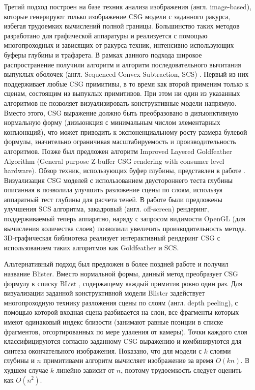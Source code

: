 {{{{{Третий подход построен на базе техник анализа изображения (англ. image-based), которые генерируют только изображение CSG модели с заданного ракурса, избегая трудоемких вычислений полной границы. Большинство таких методов разработано для графической аппаратуры и реализуется с помощью многопроходных и зависящих от ракурса техник, интенсивно использующих буферы глубины и трафарета. В рамках данного подхода широкое распространение получили алгоритм  и алгоритм последовательного вычитания выпуклых оболочек (англ. Sequenced Convex Subtraction, SCS) \todo{[3]}. Первый из них поддерживает любые CSG примитивы, в то время как второй применим только к сценам, состоящим из выпуклых примитивов. При этом ни один из указанных  алгоритмов не позволяет визуализировать конструктивные модели напрямую. Вместо этого, CSG выражение должно быть преобразовано в дизъюнктивную нормальную форму (дизъюнкция с минимальным числом элементарных конъюнкций), что может приводить к экспоненциальному росту размера булевой формулы, значительно ограничивая  масштабируемость и производительность алгоритмов. Позже был предложен алгоритм Improved Layered Goldfeather Algorithm (General purpose Z-buffer CSG rendering with consumer level hardware). Обзор техник, использующих буфер глубины, представлен в работе \todo{[93]}. Визуализация CSG моделей с использованием двустороннего теста глубины описанная в \todo{[42]} позволила улучшить разложение сцены по слоям, используя аппаратный тест глубины для расчета теней. В работе \todo{[52]} были предложены улучшения SCS алгоритма, закадровый (англ. off-screen) рендеринг, поддерживаемый теперь аппаратно, наряду с запросом видимости OpenGL (для вычисления количества слоев) позволили увеличить производительность метода. 3D-графическая библиотека  реализует интерактивный рендеринг CSG с использованием таких алгоритмов как Goldfeather и SCS. 

Альтернативный подход был предложен в более поздней работе \cmd{[4]} и получил название Blister. Вместо нормальной формы, данный метод преобразует CSG формулу к списку BList \todo{[5]}, содержащему каждый примитив ровно один раз. Для визуализации заданной конструктивной модели Blister задействует многопроходную технику разложения сцены по слоям (англ. depth peeling), с помощью которой входная сцена разбивается на слои, все фрагменты которых имеют одинаковый индекс близости (занимают равные позиции в списке фрагментов, отсортированных по мере удаления от камеры). Точки каждого слоя классифицируются согласно заданному CSG выражению и комбинируются для синтеза окончательного изображения. Показано, что для модели с $k$ слоями глубины и $n$ примитивами алгоритм вычисляет изображение за время $O(kn)$. В худшем случае $k$ линейно зависит от $n$, поэтому трудоемкость следует оценить как $O(n^2)$.

}}}}}
